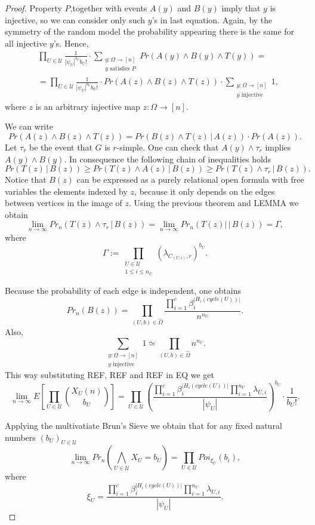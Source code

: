 \documentclass[11pt,notitlepage]{report}
\theoremstyle{definition}
\theoremstyle{remark}
\newcommand{\Ln}{\lim\limits_{n\to \infty}}
\begin{document}
\begin{proof}
	Property $P$,together with events $A(y)$ and $B(y)$ imply that $y$ is
	injective, so we can consider only such $y$'s in last equation. Again, by 
	the symmetry of the random model the probability appearing there is the same
	for all injective $y$'s. Hence,
	\begin{align}
	\nonumber
	&\prod_{U\in \mathcal{U}} 
	\frac{1}{|\psi_U|^{b_U}b_U!} \cdot
	\sum_{\substack{y:\Omega \rightarrow [n]\\y \text{ satisfies }P}}
	Pr(A(y)\wedge B(y)\wedge T(y))= \\ 
	\label{eqn:distributed3}
	& =\prod_{U\in \mathcal{U}} 
	\frac{1}{|\psi_U|^{b_U}b_U!} \cdot Pr(A(z)\wedge B(z)\wedge T(z)) \cdot
	\sum_{\substack{y:\Omega \rightarrow [n]\\y \text{ injective }}}1,
	\end{align}
	where $z$ is an arbitrary injective map $z:\Omega\rightarrow [n]$.\par
	We can write 
	\[Pr(A(z)\wedge B(z)\wedge T(z))=Pr(B(z)\wedge T(z) \, |\, A(z)) \cdot 
	Pr(A(z)).\]
	Let $\tau_r$ be the event that $G$ is $r$-simple. One can check that
	$A(y) \wedge \tau_r$ implies $A(y)\wedge B(y)$. 
	In consequence the following chain of inequalities holds
	\[Pr(T(z)\,|\, B(z))\geq Pr(T(z)\wedge A(z) \,| \, B(z)) \geq
	 Pr(T(z)\wedge \tau_r \,| \, B(z)).\]
	Notice that $B(z)$ can be expressed as a purely relational open formula
	with free variables the elements indexed by $z$, because it only depends on
	the edges between vertices in the image of $z$.
	Using the previous theorem and LEMMA we obtain
	\[\Ln Pr_n(T(z)\wedge \tau_r \,| \, B(z))= \Ln Pr_n(T(z)| \,| \, B(z)) = \Gamma, \]
	where
	\[ \Gamma:=\prod_{\substack{U\in \mathcal{U}\\ 1 \leq i\leq n_{U}}}
	(\lambda_{C_{(U,i)}, r})^{b_U}.\]
	
	Because the probability of each edge is independent, one obtains 
	\[ Pr_n(B(z))= \prod_{(U,b)\in \widehat{\Omega}} 
	\frac{\prod_{i=1}^c	\beta_i^{|H_i(cycle(U))|}}{n^{n_U}}.  \]
	Also,
	\[\sum_{\substack{y:\Omega \rightarrow [n]\\y \text{ injective }}}1
	\simeq \prod_{(U,b)\in \widehat{\Omega}} n^{n_U}. \]
	This way substituting REF, REF and REF in EQ we get
	\[\Ln E\left[\prod_{U\in \mathcal{U}}
	\binom{X_{U}(n)}{b_{U}}\right]= \prod_{U\in \mathcal{U}}
	\left(\frac{ \prod_{i=1}^c \beta_i^{|H_i(cycle(U))|} \prod_{i=1}^{n_U} \lambda_{U,i}}{|\psi_U|}\right)^{b_U}\cdot \frac{1}{b_{U}!}. \]
	
	Applying the multivatiate Brun's Sieve we obtain that for any fixed  
	natural numbers $(b_U)_{U\in \mathcal{U}}$ 
	\[\Ln Pr_n\left( \bigwedge_{U\in \mathcal{U}} X_U=b_U  \right)=
	\prod_{U\in \mathcal{U}}Poi_{\xi_U}(b_i),
	\]
	where
	\[ \xi_U= \frac{ \prod_{i=1}^c \beta_i^{|H_i(cycle(U))|} \prod_{i=1}^{n_U} \lambda_{U,i}}{|\psi_U|}.\]
	

\end{proof}
\end{document}
